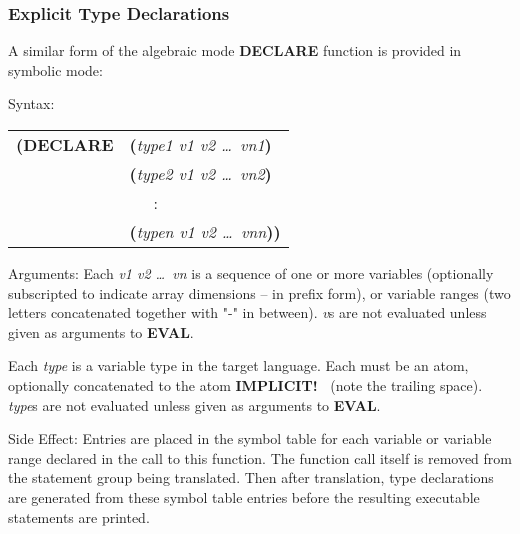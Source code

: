 \subsubsection{Explicit Type Declarations}
A similar form of the algebraic mode {\bf DECLARE} function is provided in
symbolic mode:
\begin{describe}{Syntax:}
\begin{tabular}{ll}
{\bf (DECLARE} & {\bf (}{\it type1 v1 v2 \dots\  vn1\/}{\bf )}\\
& {\bf (}{\it type2 v1 v2 \dots\  vn2\/}{\bf )}\\
& \ \ \ :\\
& {\bf (}{\it typen v1 v2 \dots\  vnn\/}{\bf )) }\\
\end{tabular}
\end{describe} 
\begin{describe}{Arguments:}
Each {\it v1 v2 \dots\  vn\/} is a sequence of one or more variables (optionally
subscripted to indicate array dimensions -- in prefix form), or variable
ranges (two letters concatenated together with "-" in between).  {\it v\/}s
are not evaluated unless given as arguments to {\bf EVAL}.

Each {\it type\/} is a variable type in the target language.  Each
must be an atom, optionally concatenated to the atom {\bf IMPLICIT!\ }
(note the trailing space).  
{\it type\/}s are not evaluated unless given as arguments to {\bf EVAL}.
\end{describe} 
\begin{describe}{Side Effect:}
Entries are placed in the symbol table for each variable or
variable range declared in the call to this function.  The
function call itself is removed from the statement group
being translated.  Then after translation, type declarations are
generated from these symbol table entries before the resulting
executable statements are printed.
\end{describe}

